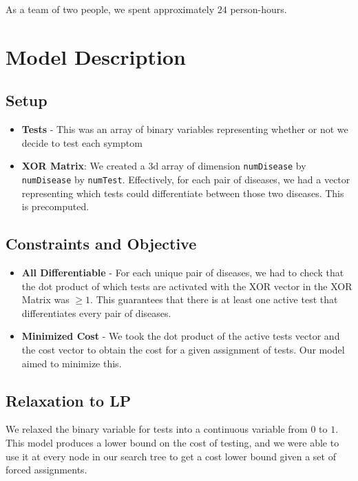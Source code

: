 \documentclass[11pt]{article}
\begin{document}
As a team of two people, we spent approximately $24$ person-hours.
\vspace{-10pt}
\section*{Model Description}
\label{sec:intro}
\subsection*{Setup}
\begin{itemize}
    \item \textbf{Tests} - This was an array of binary variables representing whether or not
    we decide to test each symptom
    \item \textbf{XOR Matrix}: We created a 3d array of dimension \texttt{numDisease} by
    \texttt{numDisease} by \texttt{numTest}. Effectively, for each pair of diseases, we had a vector
    representing which tests could differentiate between those two diseases. This is precomputed.
\end{itemize}

\subsection*{Constraints and Objective}

\begin{itemize}
    \item \textbf{All Differentiable} - For each unique pair of diseases, we had to check that the dot
    product of which tests are activated with the XOR vector in the XOR Matrix was $\geq 1$. This
    guarantees that there is at least one active test that differentiates every pair of diseases.
    \item \textbf{Minimized Cost} - We took the dot product of the active tests vector and the
    cost vector to obtain the cost for a given assignment of tests. Our model aimed to minimize this.
\end{itemize}

\subsection*{Relaxation to LP}
We relaxed the binary variable for tests into a continuous variable from $0$ to $1$. This model 
produces a lower bound on the cost of testing, and we were able to use it at every node in our
search tree to get a cost lower bound given a set of forced assignments.
\end{document}
